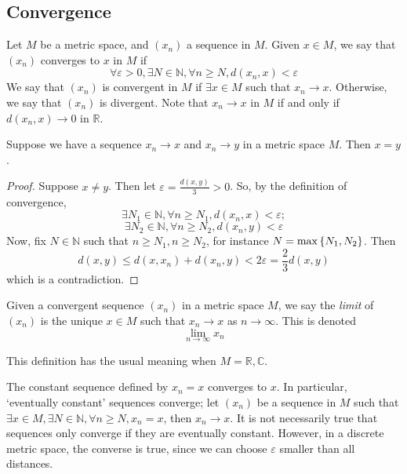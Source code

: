 \subsection{Convergence}
Let \( M \) be a metric space, and \( (x_n) \) a sequence in \( M \).
Given \( x \in M \), we say that \( (x_n) \) converges to \( x \) in \( M \) if
\[
	\forall \varepsilon > 0, \exists N \in \mathbb N, \forall n \geq N, d(x_n,x)<\varepsilon
\]
We say that \( (x_n) \) is convergent in \( M \) if \( \exists x \in M \) such that \( x_n \to x \).
Otherwise, we say that \( (x_n) \) is divergent.
Note that \( x_n \to x \) in \( M \) if and only if \( d(x_n, x) \to 0 \) in \( \mathbb R \).
\begin{lemma}
	Suppose we have a sequence \( x_n \to x \) and \( x_n \to y \) in a metric space \( M \).
	Then \( x = y \).
\end{lemma}
\begin{proof}
	Suppose \( x \neq y \).
	Then let \( \varepsilon = \frac{d(x,y)}{3} > 0 \).
	So, by the definition of convergence,
	\[
		\exists N_1 \in \mathbb N, \forall n \geq N_1, d(x_n, x) < \varepsilon;
	\]
	\[
		\exists N_2 \in \mathbb N, \forall n \geq N_2, d(x_n, y) < \varepsilon
	\]
	Now, fix \( N \in \mathbb N \) such that \( n \geq N_1, n \geq N_2 \), for instance \( N = \max\qty{N_1, N_2} \).
	Then
	\[
		d(x,y) \leq d(x, x_n) + d(x_n, y) < 2\varepsilon = \frac{2}{3} d(x,y)
	\]
	which is a contradiction.
\end{proof}
\begin{definition}
	Given a convergent sequence \( (x_n) \) in a metric space \( M \), we say the \textit{limit} of \( (x_n) \) is the unique \( x \in M \) such that \( x_n \to x \) as \( n \to \infty \).
	This is denoted
	\[
		\lim_{n \to \infty} x_n
	\]
\end{definition}
\begin{example}
	This definition has the usual meaning when \( M = \mathbb R, \mathbb C \).
\end{example}
\begin{example}
	The constant sequence defined by \( x_n = x \) converges to \( x \).
	In particular, `eventually constant' sequences converge; let \( (x_n) \) be a sequence in \( M \) such that \( \exists x \in M, \exists N \in \mathbb N, \forall n \geq N, x_n = x \), then \( x_n \to x \).
	It is not necessarily true that sequences only converge if they are eventually constant.
	However, in a discrete metric space, the converse is true, since we can choose \( \varepsilon \) smaller than all distances.
\end{example}

